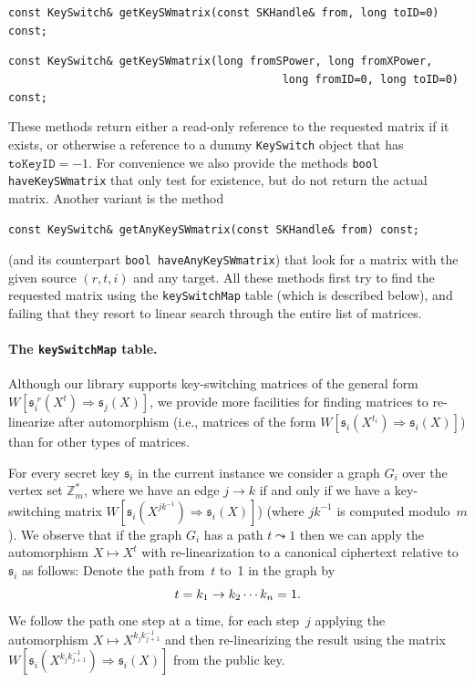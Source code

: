 \documentclass[14pt]{extarticle}
\newcommand{\Z}{\mathbb{Z}}
\newcommand{\sk}{\mathfrak{s}}
\begin{document}
\texttt{const KeySwitch\& getKeySWmatrix(const SKHandle\& from, long toID=0) const;}

\texttt{const KeySwitch\& getKeySWmatrix(long fromSPower, long fromXPower,\\
\mbox{~~~~~~~~~~~~~~~~~~~~~~~~~~~~~~~~~~~~~~~~~}
long fromID=0, long toID=0) const;}

These methods return either a read-only reference to the requested
matrix if it exists, or otherwise a reference to a dummy
\texttt{KeySwitch} object that has $\mathtt{toKeyID}=-1$. For
convenience we also provide the methods \texttt{bool haveKeySWmatrix}
that only test for existence, but do not return the actual matrix.
Another variant is the method

\texttt{const KeySwitch\& getAnyKeySWmatrix(const SKHandle\& from) const;}

\noindent
(and its counterpart \texttt{bool haveAnyKeySWmatrix}) that look for
a matrix with the given source $(r,t,i)$ and any target. All these
methods first try to find the requested matrix using the
\texttt{keySwitchMap} table (which is described below), and failing
that they resort to linear search through the entire list of
matrices.

\paragraph{The \texttt{keySwitchMap} table.}
Although our library supports key-switching matrices of the general
form $W[\sk_i^{\;r}(X^t)\Rightarrow\sk_j(X)]$, we provide more
facilities for finding matrices to re-linearize after automorphism
(i.e., matrices of the form $W[\sk_i(X^{t_i})\Rightarrow \sk_i(X)]$)
than for other types of matrices.

For every secret key $\sk_i$ in the current instance we consider
a graph $G_i$ over the vertex set $\Z_m^*$, where we have an edge
$j\to k$ if and only if we have a key-switching matrix
$W[\sk_i(X^{jk^{-1}})\Rightarrow \sk_i(X)]$) (where $jk^{-1}$ is
computed modulo~$m$). We observe that if the graph $G_i$ has a path
$t\leadsto 1$ then we can apply the automorphism $X\mapsto X^t$
with re-linearization to a canonical ciphertext relative to $\sk_i$
as follows: Denote the path from~$t$ to~1 in the graph by
\[
t=k_1 \to k_2 \cdots \do k_n = 1.
\]
We follow the path one step at a time, for each step~$j$ applying the
automorphism $X\mapsto X^{k_j k_{j+1}^{-1}}$ and then re-linearizing
the result using the matrix $W[\sk_i(X^{k_jk_{j+1}^{-1}}) \Rightarrow
\sk_i(X)]$ from the public key.
\end{document}
